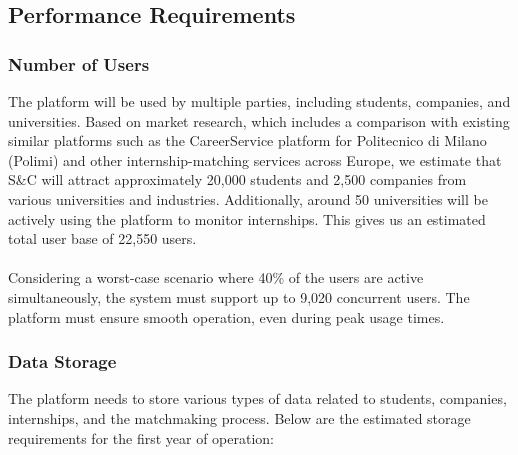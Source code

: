\subsection{Performance Requirements}

\subsubsection{Number of Users}
The platform will be used by multiple parties, including students, companies, and universities. Based on market research, which includes a comparison with existing similar platforms such as the CareerService platform for Politecnico di Milano (Polimi) and other internship-matching services across Europe, we estimate that S\&C will attract approximately 20,000 students and 2,500 companies from various universities and industries. Additionally, around 50 universities will be actively using the platform to monitor internships. This gives us an estimated total user base of 22,550 users.\\ \\
Considering a worst-case scenario where 40\% of the users are active simultaneously, the system must support up to 9,020 concurrent users. The platform must ensure smooth operation, even during peak usage times.

\subsubsection{Data Storage}
The platform needs to store various types of data related to students, companies, internships, and the matchmaking process. Below are the estimated storage requirements for the first year of operation:

